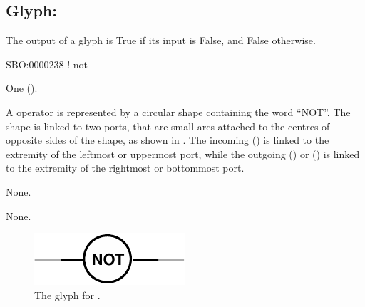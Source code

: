 \subsection{Glyph: }\label{sec:not}

The output of a  glyph is True if its input is False, and False otherwise.

\begin{glyphDescription}

\glyphSboTerm
SBO:0000238 ! not

\glyphIncoming One  ().

\glyphOutgoing

\glyphContainer
A  operator is represented by a circular shape containing the word ``NOT''.
The shape is linked to two ports, that are small arcs attached to the centres of opposite sides of the shape, as shown in .
The incoming  () is linked to the extremity of the leftmost or uppermost port, while the outgoing  () or  () is linked to the extremity of the rightmost or bottommost port.

\glyphLabel
None.

\glyphAux
None.

\end{glyphDescription}

\begin{figure}[H]
  \centering
  \includegraphics{images/build/not.pdf}
  \caption{The \PD glyph for .}
  \label{fig:not}
\end{figure}

